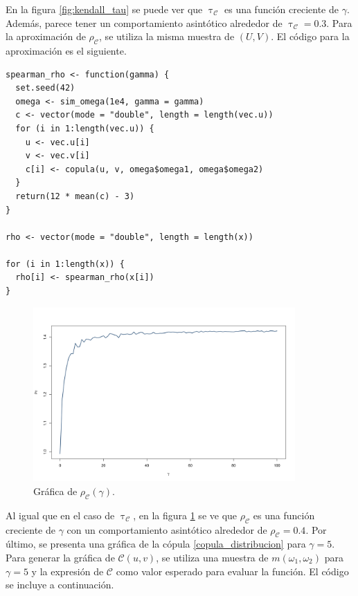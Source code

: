 \documentclass[11pt,a4paper]{article}
\begin{document}
En la figura \ref{fig:kendall_tau} se puede ver que $\uptau_\mathcal{C}$ es una función creciente de $\gamma$. Además, parece tener un comportamiento asintótico alrededor de $\uptau_\mathcal{C} = 0.3$. Para la aproximación de $\rho_\mathcal{C}$, se utiliza la misma muestra de $(U, V)$. El código para la aproximación es el siguiente.\\

\begin{lstlisting}
spearman_rho <- function(gamma) {
  set.seed(42)
  omega <- sim_omega(1e4, gamma = gamma)
  c <- vector(mode = "double", length = length(vec.u))
  for (i in 1:length(vec.u)) {
    u <- vec.u[i]
    v <- vec.v[i]
    c[i] <- copula(u, v, omega$omega1, omega$omega2)
  }
  return(12 * mean(c) - 3)
}

rho <- vector(mode = "double", length = length(x))

for (i in 1:length(x)) {
  rho[i] <- spearman_rho(x[i])
}
\end{lstlisting}\leavevmode\newline

\begin{figure}[h]
\centering\includegraphics[width=10cm]{spearman_rho.png}
\caption{Gráfica de $\rho_\mathcal{C} (\gamma)$.}
\label{fig:spearman_rho}
\end{figure}

Al igual que en el caso de $\uptau_\mathcal{C}$, en la figura \ref{fig:spearman_rho} se ve que $\rho_\mathcal{C}$ es una función creciente de $\gamma$ con un comportamiento asintótico alrededor de $\rho_\mathcal{C} = 0.4$. Por último, se presenta una gráfica de la cópula \eqref{copula_distribucion} para $\gamma = 5$. Para generar la gráfica de $\mathcal{C}(u, v)$, se utiliza una muestra de $m(\omega_1, \omega_2)$ para $\gamma = 5$ y la expresión de $\mathcal{C}$ como valor esperado para evaluar la función. El código se incluye a continuación.\\
\end{document}
